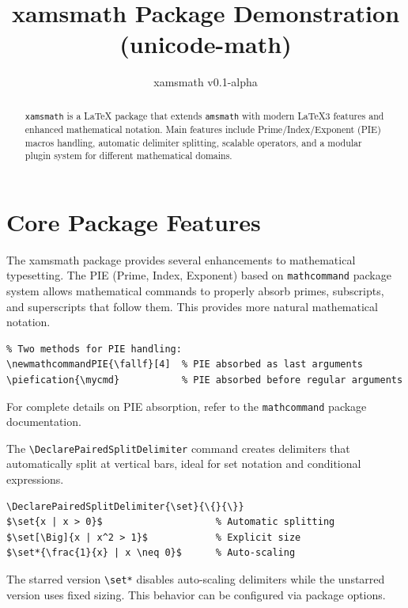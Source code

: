 \documentclass{article}
\title{xamsmath Package Demonstration (unicode-math)}
\author{xamsmath v0.1-alpha}
\date{}
\begin{document}
\newpage

\maketitle

\begin{abstract}
  \texttt{xamsmath} is a LaTeX package that extends \texttt{amsmath} with modern LaTeX3 features and enhanced mathematical notation. Main features include Prime/Index/Exponent (PIE) macros handling, automatic delimiter splitting, scalable operators, and a modular plugin system for different mathematical domains. 
\end{abstract}

\tableofcontents

\section{Core Package Features}

The xamsmath package provides several enhancements to mathematical typesetting. The PIE (Prime, Index, Exponent) based on \texttt{mathcommand} package system allows mathematical commands to properly absorb primes, subscripts, and superscripts that follow them. This provides more natural mathematical notation.

\begin{verbatim}
% Two methods for PIE handling:
\newmathcommandPIE{\fallf}[4]  % PIE absorbed as last arguments
\piefication{\mycmd}           % PIE absorbed before regular arguments
\end{verbatim}

For complete details on PIE absorption, refer to the \texttt{mathcommand} package documentation.

The \verb|\DeclarePairedSplitDelimiter| command creates delimiters that automatically split at vertical bars, ideal for set notation and conditional expressions.

\begin{verbatim}
\DeclarePairedSplitDelimiter{\set}{\{}{\}}
$\set{x | x > 0}$                    % Automatic splitting
$\set[\Big]{x | x^2 > 1}$            % Explicit size  
$\set*{\frac{1}{x} | x \neq 0}$      % Auto-scaling
\end{verbatim}

The starred version \verb|\set*| disables auto-scaling delimiters while the unstarred version uses fixed sizing. This behavior can be configured via package options.
\end{document}
